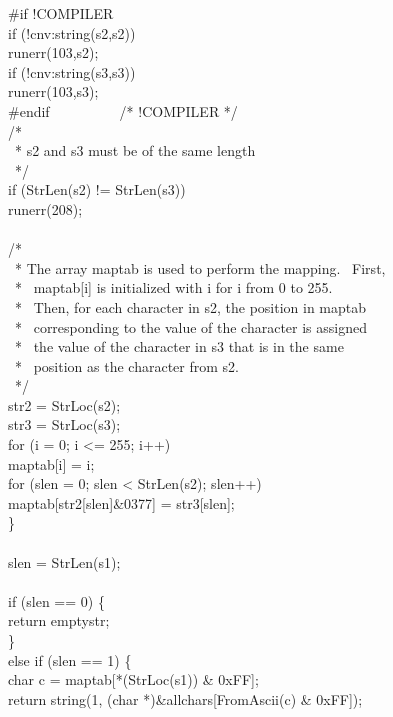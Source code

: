 {\#if !COMPILER\\
\>\>\>if (!cnv:string(s2,s2))\\
\>\>\>\>runerr(103,s2);\\
\>\>\>if (!cnv:string(s3,s3))\\
\>\>\>\>runerr(103,s3);\\
\#endif\ \ \ \ \ \ \ \ \ \ /* !COMPILER */\\
\>\>\>/*\\
\>\>\>\ * s2 and s3 must be of the same length\\
\>\>\>\ */\\
\>\>\>if (StrLen(s2) != StrLen(s3))\\
\>\>\>\>runerr(208);\\
\\
\>\>\>/*\\
\>\>\>\ * The array maptab is used to perform the mapping. \ First,\\
\>\>\>\ * \ maptab[i] is initialized with i for i from 0 to 255.\\
\>\>\>\ * \ Then, for each character in s2, the position in maptab\\
\>\>\>\ * \ corresponding to the value of the character is assigned\\
\>\>\>\ * \ the value of the character in s3 that is in the same\\
\>\>\>\ * \ position as the character from s2.\\
\>\>\>\ */\\
\>\>\>str2 = StrLoc(s2);\\
\>\>\>str3 = StrLoc(s3);\\
\>\>\>for (i = 0; i <= 255; i++)\\
\>\>\>\>maptab[i] = i;\\
\>\>\>for (slen = 0; slen < StrLen(s2); slen++)\\
\>\>\>\>maptab[str2[slen]\&0377] = str3[slen];\\
\>\>\>\}\\
\\
\>\>\>slen = StrLen(s1);\\
\\
\>\>\>if (slen == 0) \{\\
\>\>\>\>return emptystr;\\
\>\>\>\}\\
\>\>\>else if (slen == 1) \{\\
\>\>\>\>char c = maptab[*(StrLoc(s1)) \& 0xFF];\\
\>\>\>\>return string(1, (char *)\&allchars[FromAscii(c) \& 0xFF]);\\
}
